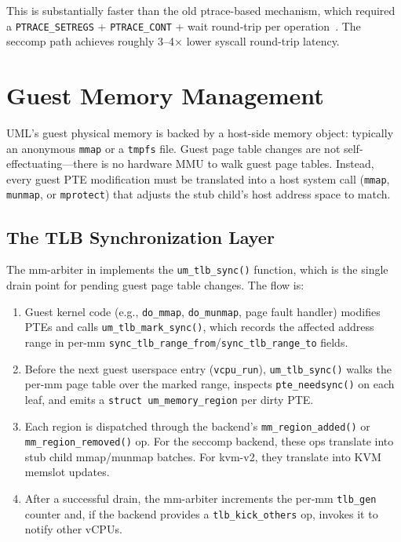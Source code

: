 This is substantially faster than the old ptrace-based mechanism, which
required a \texttt{PTRACE\_SETREGS} + \texttt{PTRACE\_CONT} + wait round-trip
per operation~\cite{ptrace-man}.  The seccomp path achieves roughly 3--4$\times$
lower syscall round-trip latency.


\section{Guest Memory Management}
\label{sec:guest-mm}

UML's guest physical memory is backed by a host-side memory object: typically
an anonymous \texttt{mmap} or a \texttt{tmpfs} file.  Guest page table changes
are not self-effectuating---there is no hardware MMU to walk guest page tables.
Instead, every guest PTE modification must be translated into a host system
call (\texttt{mmap}, \texttt{munmap}, or \texttt{mprotect}) that adjusts the
stub child's host address space to match.

\subsection{The TLB Synchronization Layer}

The mm-arbiter in  implements the
\texttt{um\_tlb\_sync()} function, which is the single drain point for pending
guest page table changes.  The flow is:

\begin{enumerate}[leftmargin=2em]
\item Guest kernel code (e.g., \texttt{do\_mmap}, \texttt{do\_munmap},
  page fault handler) modifies PTEs and calls \texttt{um\_tlb\_mark\_sync()},
  which records the affected address range in per-mm
  \texttt{sync\_tlb\_range\_from}/\texttt{sync\_tlb\_range\_to} fields.
\item Before the next guest userspace entry (\texttt{vcpu\_run}),
  \texttt{um\_tlb\_sync()} walks the per-mm page table over the marked range,
  inspects \texttt{pte\_needsync()} on each leaf, and emits a
  \texttt{struct um\_memory\_region} per dirty PTE.
\item Each region is dispatched through the backend's
  \texttt{mm\_region\_added()} or \texttt{mm\_region\_removed()} op.  For the
  seccomp backend, these ops translate into stub child mmap/munmap batches.
  For kvm-v2, they translate into KVM memslot updates.
\item After a successful drain, the mm-arbiter increments the per-mm
  \texttt{tlb\_gen} counter and, if the backend provides a
  \texttt{tlb\_kick\_others} op, invokes it to notify other vCPUs.
\end{enumerate}

